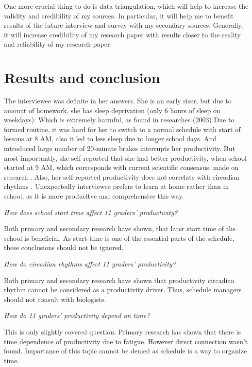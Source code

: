 \documentclass[12pt,a4paper,stu, donotrepeattitle, floatsintext]{apa7}
\begin{document}
One more crucial thing to do is data triangulation, which will help to increase the validity and credibility of my sources. In particular, it will help me to benefit results of the future interview and survey with my secondary sources. Generally, it will increase credibility of my research paper with results closer to the reality and reliability of my research paper.

\section{Results and conclusion}

The interviewee was definite in her answers. She is an early riser, but due to amount of homework, she has sleep deprivation (only 6 hours of sleep on weekdays). Which is extremely harmful, as found in researches (2003) \cite{Giurgiu2021,dongen2003} Due to formed routine, it was hard for her to switch to a normal schedule with start of lessons at 8 AM, also it led to less sleep due to longer school days. And introduced large number of 20-minute brakes interrupts her productivity. But most importantly, she self-reported that she had better productivity, when school started at 9 AM, which corresponds with current scientific consensus, made on research \cite{Kelley201,Owens2010}. Also, her self-reported productivity does not correlate with circadian rhythms \cite{Figueiro2011}. Unexpectedly interviewee prefers to learn at home rather than in school, as it is more producitve and comprehensive this way.

\textit{How does school start time affect 11 graders’ productivity?}

Both primary and secondary \cite{Kelley2017, Owens2010} research have shown, that later start time of the school is beneficial. As start time is one of the essential parts of the schedule, these conclusions should not be ignored.

\textit{How do circadian rhythms affect 11 graders’ productivity?}

Both primary and secondary \cite{Figueiro2011} research have shown that productivity circadian rhythm cannot be considered as a productivity driver. Thus, schedule managers should not consult with biologists.

\textit{How do 11 graders’ productivity depend on time?}

This is only slightly covered question. Primary research has shown that there is time dependence of productivity due to fatigue. However direct connection wasn’t found. Importance of this topic cannot be denied as schedule is a way to organize time.
\end{document}
